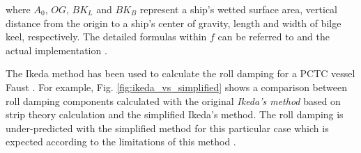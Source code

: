 

where $A_{0}$, $OG$, $BK_{L}$ and $BK_{B}$ represent a ship's wetted surface area, vertical distance from the origin to a ship's center of gravity, length and width of bilge keel, respectively. The detailed formulas within $f$ can be referred to \parencite{kawahara_simple_2011} and the actual implementation \parencite{alexandersson_martinlarsalbertrolldecay-estimators_2020}.



{}

The Ikeda method has been used to calculate the roll damping for a PCTC vessel Faust \parencite{soder_assessment_2019}. For example, Fig. \ref{fig:ikeda_vs_simplified} shows a comparison between roll damping components calculated with the original \emph{Ikeda's method} based on strip theory calculation and the simplified Ikeda's method. The roll damping is under-predicted with the simplified method for this particular case which is expected according to the limitations of this method  \parencite{kawahara_simple_2011}.

